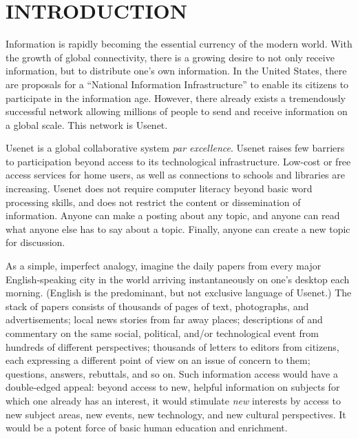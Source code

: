 
\section {INTRODUCTION}
\label{sec:introduction}
  
Information is rapidly becoming the essential currency of the modern world.
With the growth of global connectivity, there is a growing desire to not only
receive information, but to distribute one's own information. In the United
States, there are proposals for a ``National Information Infrastructure''
\cite{nii-agenda} to enable its citizens to participate in the information age.
However, there already exists a tremendously successful network allowing
millions of people to send and receive information on a global scale.  This
network is Usenet.

Usenet is a global collaborative system {\em par excellence}.  Usenet
raises few barriers to participation beyond access to its technological
infrastructure. Low-cost or free access services for home users, as well as
connections to schools and libraries are increasing.  Usenet does not
require computer literacy beyond basic word processing skills, and does not
restrict the content or dissemination of information.  Anyone can make a
posting about any topic, and anyone can read what anyone else has to say
about a topic.  Finally, anyone can create a new topic for discussion.

As a simple, imperfect analogy, imagine the daily papers from every major
English-speaking city in the world arriving instantaneously on one's desktop
each morning. (English is the predominant, but not exclusive language of
Usenet.)  The stack of papers consists of thousands of pages of text,
photographs, and advertisements; local news stories from far away places;
descriptions of and commentary on the same social, political, and/or
technological event from hundreds of different perspectives; thousands of
letters to editors from citizens, each expressing a different point of view on
an issue of concern to them; questions, answers, rebuttals, and so on.  Such
information access would have a double-edged appeal: beyond access to new,
helpful information on subjects for which one already has an interest, it would
stimulate {\em new} interests by access to new subject areas, new events, new
technology, and new cultural perspectives.  It would be a potent force of basic
human education and enrichment.

